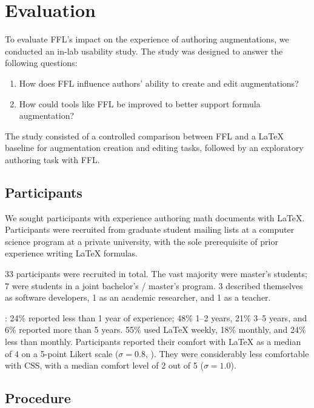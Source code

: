 \section{Evaluation}

To evaluate FFL's impact on the experience of authoring augmentations, we conducted an in-lab usability study. The study was designed to answer the following questions:

\begin{enumerate}
\item How does FFL influence authors' ability to create and edit augmentations?
\item How could tools like FFL be improved to better support formula augmentation?
\end{enumerate}

The study consisted of a controlled comparison between FFL and a LaTeX baseline for augmentation creation and editing tasks, followed by an exploratory authoring task with FFL.

\subsection{Participants}\label{study-participants}

We sought participants with experience authoring math documents with LaTeX. Participants were recruited from graduate student mailing lists at a computer science program at a private university, with the sole prerequisite of prior experience writing LaTeX formulas.

33 participants were recruited in total. The vast majority were master's students; 7 were students in a joint bachelor's / master's program. 3 described themselves as software developers, 1 as an academic researcher, and 1 as a teacher.

: 24\% reported less than 1 year of experience; 48\% 1--2 years, 21\% 3--5 years, and 6\% reported more than 5 years. 55\% used LaTeX weekly, 18\% monthly, and 24\% less than monthly. Participants reported their comfort with LaTeX as a median of 4 on a 5-point Likert scale ($\sigma = 0.8$, ). They were considerably less comfortable with CSS, with a median comfort level of 2 out of 5 ($\sigma = 1.0$).

\subsection{Procedure}

